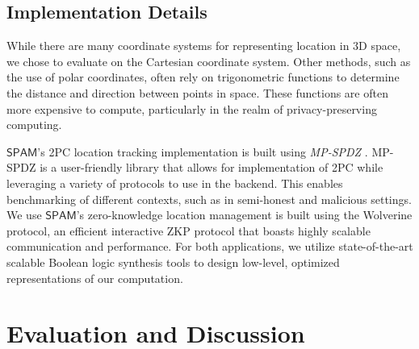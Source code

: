 \documentclass[9pt,sigconf,screen]{acmart}
\newcommand{\nojan}[1]{\textcolor{red}{{\sf (NS:} {\sl{#1})}}}
\newcommand{\nasimeh}[1]{\textcolor{purple}{{\sf (NH:} {\sl{#1})}}}
\newcommand\sys{$\mathsf{SPAM}$\xspace}
\begin{document}

\subsection{Implementation Details}

While there are many coordinate systems for representing location in 3D space, we chose to evaluate on the Cartesian coordinate system. Other methods, such as the use of polar coordinates, often rely on trigonometric functions to determine the distance and direction between points in space. These functions are often more expensive to compute, particularly in the realm of privacy-preserving computing. 

\sys's 2PC location tracking implementation is built using \textit{MP-SPDZ} \cite{mpspdz}. MP-SPDZ is a user-friendly library that allows for implementation of 2PC while leveraging a variety of protocols to use in the backend. This enables benchmarking of different contexts, such as in semi-honest and malicious settings. We use  \sys's zero-knowledge location management is built using the Wolverine \cite{weng2021wolverine} protocol, an efficient interactive ZKP protocol that boasts highly scalable communication and performance. For both applications, we utilize state-of-the-art scalable Boolean logic synthesis tools \cite{emp, tg} to design low-level, optimized representations of our computation.




\section{Evaluation and Discussion}\label{eval}
\end{document}
